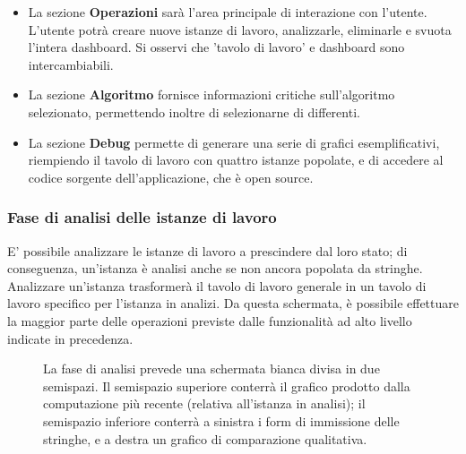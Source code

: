 \begin{itemize}
    \item La sezione \textbf{Operazioni} sarà l'area principale di interazione con l'utente. L'utente potrà creare nuove istanze di lavoro, analizzarle, eliminarle e svuota l'intera dashboard. Si osservi che 'tavolo di lavoro' e dashboard sono intercambiabili.
    \item La sezione \textbf{Algoritmo} fornisce informazioni critiche sull'algoritmo selezionato, permettendo inoltre di selezionarne di differenti. 
    \item La sezione \textbf{Debug} permette di generare una serie di grafici esemplificativi, riempiendo il tavolo di lavoro con quattro istanze popolate, e di accedere al codice sorgente dell'applicazione, che è open source.
\end{itemize}

\subsubsection{Fase di analisi delle istanze di lavoro}

E' possibile analizzare le istanze di lavoro a prescindere dal loro stato; di conseguenza, un'istanza è analisi anche se non ancora popolata da stringhe. Analizzare un'istanza trasformerà il tavolo di lavoro generale in un tavolo di lavoro specifico per l'istanza in analizi. Da questa schermata, è possibile effettuare la maggior parte delle operazioni previste dalle funzionalità ad alto livello indicate in precedenza.

\begin{figure}[ht!]
    \centering
    \caption{La fase di analisi prevede una schermata bianca divisa in due semispazi. Il semispazio superiore conterrà il grafico prodotto dalla computazione più recente (relativa all'istanza in analisi); il semispazio inferiore conterrà a sinistra i form di immissione delle stringhe, e a destra un grafico di comparazione qualitativa.}
    \label{fig:esempio}
\end{figure}

